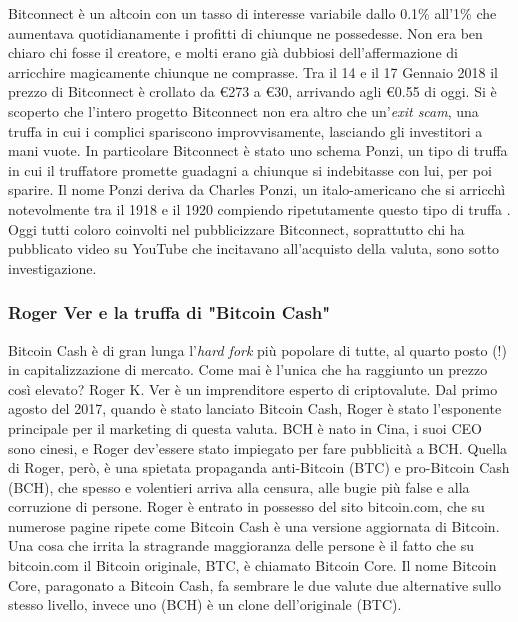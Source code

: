 \documentclass {article}
\begin{document}
Bitconnect è un altcoin con un tasso di interesse variabile dallo 0.1\% all'1\% che aumentava quotidianamente i profitti di chiunque ne possedesse.
Non era ben chiaro chi fosse il creatore, e molti erano già dubbiosi dell'affermazione di arricchire magicamente chiunque ne comprasse.
Tra il 14 e il 17 Gennaio 2018 il prezzo di Bitconnect è crollato da \euro{273} a \euro{30}, arrivando agli \euro{0.55} di oggi.
Si è scoperto che l'intero progetto Bitconnect non era altro che un'\textit{exit scam}, una truffa in cui i complici spariscono improvvisamente, lasciando gli investitori a mani vuote.
In particolare Bitconnect è stato uno schema Ponzi, un tipo di truffa in cui il truffatore promette guadagni a chiunque si indebitasse con lui, per poi sparire.
Il nome Ponzi deriva da Charles Ponzi, un italo-americano che si arricchì notevolmente tra il 1918 e il 1920 compiendo ripetutamente questo tipo di truffa \cite{ponzi}.
Oggi tutti coloro coinvolti nel pubblicizzare Bitconnect, soprattutto chi ha pubblicato video su YouTube che incitavano all'acquisto della valuta, sono sotto investigazione.


\subsubsection {Roger Ver e la truffa di "Bitcoin Cash"}


Bitcoin Cash è di gran lunga l'\textit{hard fork} più popolare di tutte, al quarto posto (!) in capitalizzazione di mercato. Come mai è l'unica che ha raggiunto un prezzo così elevato?
Roger K. Ver è un imprenditore esperto di criptovalute.
Dal primo agosto del 2017, quando è stato lanciato Bitcoin Cash, Roger è stato l'esponente principale per il marketing di questa valuta. BCH è nato in Cina, i suoi CEO sono cinesi, e Roger dev'essere stato impiegato per fare pubblicità a BCH.
Quella di Roger, però, è una spietata propaganda anti-Bitcoin (BTC) e pro-Bitcoin Cash (BCH), che spesso e volentieri arriva alla censura, alle bugie più false e alla corruzione di persone.
Roger è entrato in possesso del sito bitcoin.com, che su numerose pagine ripete come Bitcoin Cash è una versione aggiornata di Bitcoin. Una cosa che irrita la stragrande maggioranza delle persone è il fatto che su bitcoin.com il Bitcoin originale, BTC, è chiamato Bitcoin Core.
Il nome Bitcoin Core, paragonato a Bitcoin Cash, fa sembrare le due valute due alternative sullo stesso livello, invece uno (BCH) è un clone dell'originale (BTC).
\end{document}
